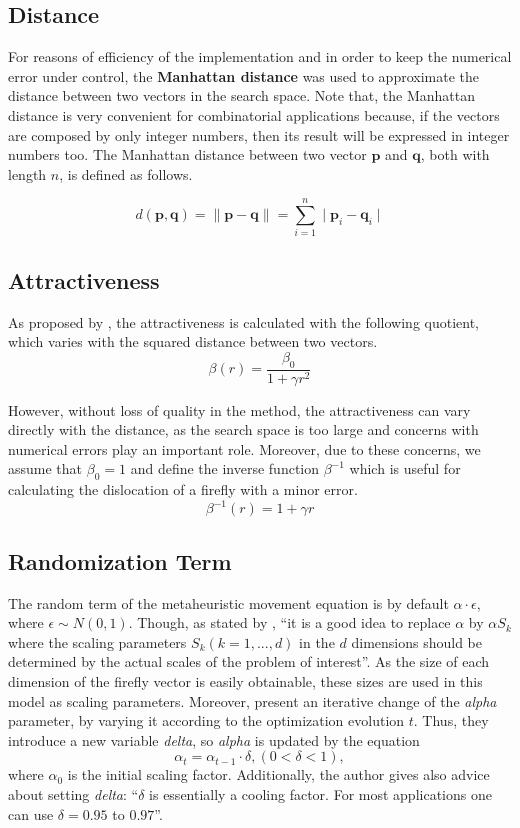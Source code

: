 \documentclass[tuberlin,cic,tc,openright,english,noabntcite,oneside]{iiufrgs}
\begin{document}
\subsection{Distance}
For reasons of efficiency of the implementation and in order to keep the numerical error under control, the \textbf{Manhattan distance} was used to approximate the distance between two vectors in the search space. Note that, the Manhattan distance is very convenient for combinatorial applications because, if the vectors are composed by only integer numbers, then its result will be expressed in integer numbers too. The Manhattan distance between two vector $\mathbf{p}$ and $\mathbf{q}$, both with length $n$, is defined as follows.

$$d(\mathbf{p},\mathbf{q}) = \parallel \mathbf{p} - \mathbf{q} \parallel = \sum_{i=1}^{n} \mid \mathbf{p}_{i}-\mathbf{q}_{i} \mid$$

\subsection{Attractiveness}\label{sec:attractiveness}
As proposed by \textcite[p. 173]{yang_firefly_2009}, the attractiveness is calculated with the following quotient, which varies with the squared distance between two vectors.
$$\beta(r) = \frac{\beta_{0}}{1 + \gamma r^2}$$

However, without loss of quality in the method, the attractiveness can vary directly with the distance, as the search space is too large and concerns with numerical errors play an important role. Moreover, due to these concerns, we assume that $\beta_0 = 1$ and define the inverse function $\beta^{-1}$ which is useful for calculating the dislocation of a firefly with a minor error.
$$\beta^{-1}(r) = 1 + \gamma r$$

\subsection{Randomization Term}\label{sec:random_term}
The random term of the metaheuristic movement equation is by default $\alpha \cdot \epsilon$, where $\epsilon \sim N(0,1)$. Though, as stated by \textcite[p. 80]{yang_firefly_2010}, \enquote{it is a good idea to replace $\alpha$ by $\alpha S_k$ where the scaling parameters $S_k (k=1,...,d)$ in the $d$ dimensions should be determined by the actual scales of the problem of interest}. As the size of each dimension of the firefly vector is easily obtainable, these sizes are used in this model as scaling parameters. Moreover, \textcite[p. 37-38]{yang_firefly_2013} present an iterative change of the \emph{alpha} parameter, by varying it according to the optimization evolution $t$. Thus, they introduce a new variable \emph{delta}, so \emph{alpha} is updated by the equation
$$ \alpha_t = \alpha_{t-1} \cdot \delta, (0 < \delta < 1),$$ where $\alpha_0$ is the initial scaling factor. Additionally, the author gives also advice about setting \emph{delta}: \enquote{$\delta$ is essentially a cooling factor. For most applications one can use $\delta = 0.95$ to $0.97$}.
\end{document}
